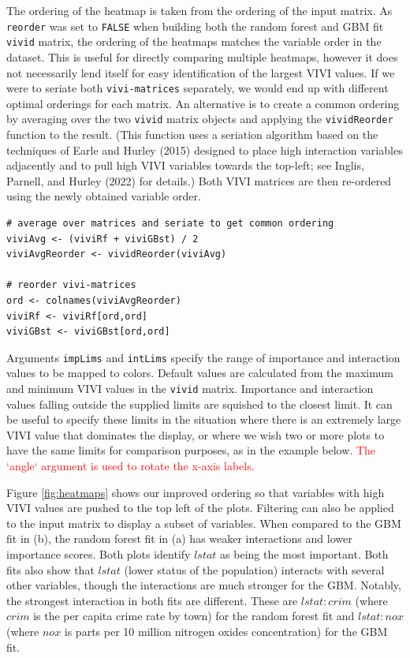 The ordering of the heatmap is taken from the ordering of the input matrix. As \texttt{reorder} was set to \texttt{FALSE} when building both the random forest and GBM fit \texttt{vivid} matrix, the ordering of the heatmaps matches the variable order in the dataset. This is useful for directly comparing multiple heatmaps, however it does not necessarily lend itself for easy identification of the largest VIVI values. If we were to seriate both \texttt{vivi-matrices} separately, we would end up with different optimal orderings for each matrix. An alternative is to create a common ordering by averaging over the two \texttt{vivid} matrix objects and applying the \texttt{vividReorder} function to the result.
(This function uses a seriation algorithm based on the techniques of Earle and Hurley (2015) designed to place high interaction variables adjacently and to pull high VIVI variables towards the top-left; see Inglis, Parnell, and Hurley (2022) for details.)
Both VIVI matrices are then re-ordered using the newly obtained variable order.

\begin{verbatim}
# average over matrices and seriate to get common ordering
viviAvg <- (viviRf + viviGBst) / 2
viviAvgReorder <- vividReorder(viviAvg)

# reorder vivi-matrices 
ord <- colnames(viviAvgReorder)
viviRf <- viviRf[ord,ord]
viviGBst <- viviGBst[ord,ord]
\end{verbatim}

Arguments \texttt{impLims} and \texttt{intLims} specify the range of importance and interaction values to be mapped to colors. Default values are calculated from the maximum and minimum VIVI values in the \texttt{vivid} matrix. Importance and interaction values falling outside the supplied limits are squished to the closest limit. It can be useful to specify these limits in the situation where there is an extremely large VIVI value that dominates the display, or where we wish two or more plots to have the same limits for comparison purposes, as in the example below. \textcolor{red}{The `angle` argument is used to rotate the x-axis labels.}

Figure \ref{fig:heatmaps} shows our improved ordering so that variables with high VIVI values are pushed to the top left of the plots. Filtering can also be applied to the input matrix to display a subset of variables. When compared to the GBM fit in (b), the random forest fit in (a) has weaker interactions and lower importance scores. Both plots identify \(lstat\) as being the most important. Both fits also show that \(lstat\) (lower status of the population) interacts with several other variables, though the interactions are much stronger for the GBM. Notably, the strongest interaction in both fits are different. These are \(lstat:crim\) (where \(crim\) is the per capita crime rate by town) for the random forest fit and \(lstat:nox\) (where \(nox\) is parts per 10 million nitrogen oxides concentration) for the GBM fit.


